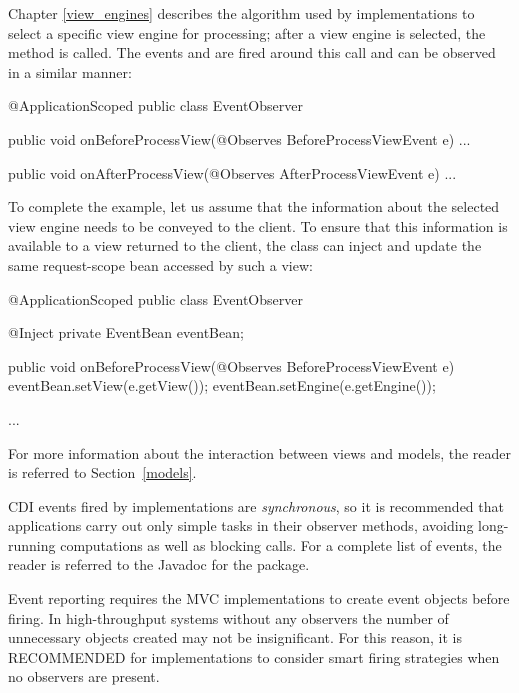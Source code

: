 Chapter \ref{view_engines} describes the algorithm used by implementations to select a
specific view engine for processing; after a view engine is selected, the method
 is called. The events 
and  are fired around this call and can be observed
in a similar manner:

\begin{listing}{1}
@ApplicationScoped
public class EventObserver {

    public void onBeforeProcessView(@Observes BeforeProcessViewEvent e) {
        ...
    }
    
    public void onAfterProcessView(@Observes AfterProcessViewEvent e) {
        ...
    }
}
\end{listing}

To complete the example, let us assume that the information about the selected
view engine needs to be conveyed to the client. To ensure that this information
is available to a view returned to the client, the  class
can inject and update the same request-scope bean accessed by such a view:

\begin{listing}{1}
@ApplicationScoped
public class EventObserver {

    @Inject
    private EventBean eventBean;

    public void onBeforeProcessView(@Observes BeforeProcessViewEvent e) {
        eventBean.setView(e.getView());
        eventBean.setEngine(e.getEngine());
    }
    
    ...
}
\end{listing}

For more information about the interaction between views and models, the reader
is referred to Section~\ref{models}. 

CDI events fired by implementations are {\em synchronous},
so it is recommended that applications carry out only simple tasks in 
their observer methods, avoiding long-running computations as well as blocking calls.
For a complete list of events, the reader is referred to the Javadoc for the 
 package.

Event reporting requires the MVC implementations to create event objects before
firing. In high-throughput systems without any observers the number of unnecessary
objects created may not be insignificant. For this reason, it is RECOMMENDED
for implementations to consider smart firing strategies when no observers
are present.


